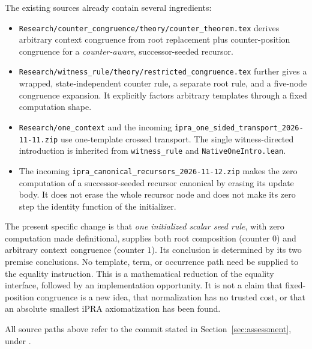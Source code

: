 The existing sources already contain several ingredients:
\begin{itemize}
\item \texttt{Research/counter\_congruence/theory/counter\_theorem.tex}
derives arbitrary context congruence from root replacement plus
counter-position congruence for a \emph{counter-aware}, successor-seeded
recursor.
\item \texttt{Research/witness\_rule/theory/restricted\_congruence.tex}
further gives a wrapped, state-independent counter rule, a separate root
rule, and a five-node congruence expansion. It explicitly factors arbitrary
templates through a fixed computation shape.
\item \texttt{Research/one\_context} and the incoming
\texttt{ipra\_one\_sided\_transport\_2026-11-11.zip} use one-template
crossed transport. The single witness-directed introduction is inherited
from \texttt{witness\_rule} and \texttt{NativeOneIntro.lean}.
\item The incoming \texttt{ipra\_canonical\_recursors\_2026-11-12.zip}
makes the zero computation of a successor-seeded recursor canonical by
erasing its update body. It does not erase the whole recursor node and
does not make its zero step the identity function of the initializer.
\end{itemize}

The present specific change is that \emph{one initialized scalar seed
rule}, with zero computation made definitional, supplies both root
composition (counter $0$) and arbitrary context congruence (counter $1$).
Its conclusion is determined by its two premise conclusions. No template,
term, or occurrence path need be supplied to the equality instruction.
This is a mathematical reduction of the equality interface, followed by
an implementation opportunity. It is not a claim that fixed-position
congruence is a new idea, that normalization has no trusted cost, or that
an absolute smallest iPRA axiomatization has been found.

All source paths above refer to the commit stated in
Section~\ref{sec:assessment}, under
.
